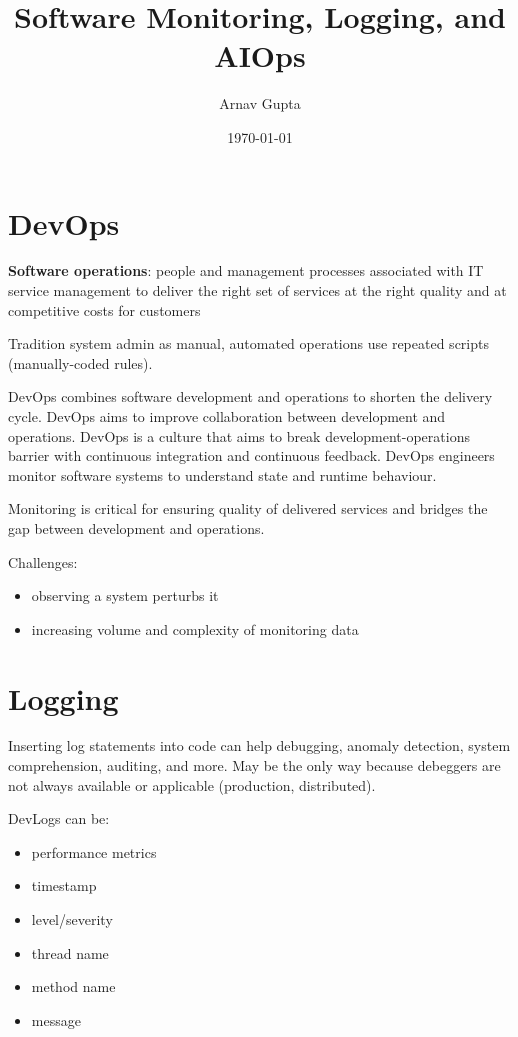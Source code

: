 \documentclass[11pt]{article}
\author{Arnav Gupta}
\date{\today}
\title{Software Monitoring, Logging, and AIOps}
\begin{document}
\maketitle
\tableofcontents

\section{DevOps}
\label{sec:org3454cd0}
\textbf{Software operations}: people and management processes associated with IT service management to deliver
the right set of services at the right quality and at competitive costs for customers

Tradition system admin as manual, automated operations use repeated scripts (manually-coded rules).

DevOps combines software development and operations to shorten the delivery cycle.
DevOps aims to improve collaboration between development and operations.
DevOps is a culture that aims to break development-operations barrier with continuous integration
and continuous feedback.
DevOps engineers monitor software systems to understand state and runtime behaviour.

Monitoring is critical for ensuring quality of delivered services and bridges the gap between development
and operations.

Challenges:
\begin{itemize}
\item observing a system perturbs it
\item increasing volume and complexity of monitoring data
\end{itemize}
\section{Logging}
\label{sec:orgd218a0c}
Inserting log statements into code can help debugging, anomaly detection, system comprehension, auditing,
and more.
May be the only way because debeggers are not always available or applicable (production, distributed).

DevLogs can be:
\begin{itemize}
\item performance metrics
\item timestamp
\item level/severity
\item thread name
\item method name
\item message
\end{itemize}
\end{document}
